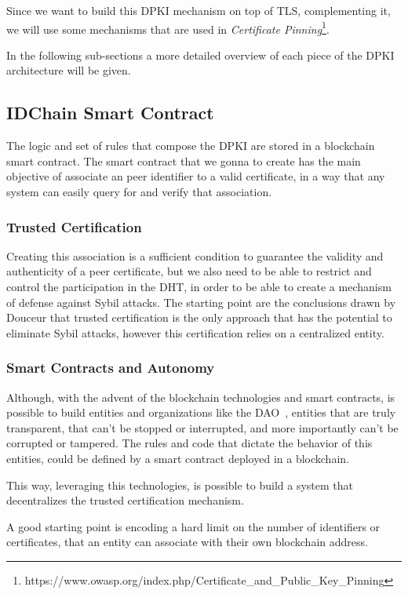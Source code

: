 Since we want to build this DPKI mechanism on top of TLS, complementing it, we will use some mechanisms that are used in \textit{Certificate Pinning}\footnote{https://www.owasp.org/index.php/Certificate\_and\_Public\_Key\_Pinning}.

In the following sub-sections a more detailed overview of each piece of the \ac{DPKI} architecture will be given.

\subsection{IDChain Smart Contract}

The logic and set of rules that compose the \ac{DPKI} are stored in a blockchain smart contract.
The smart contract that we gonna to create has the main objective of associate an peer identifier to a valid certificate, in a way that any system can easily query for and verify that association.

\subsubsection{Trusted Certification}
Creating this association is a sufficient condition to guarantee the validity and authenticity of a peer certificate, but we also need to be able to restrict and control the participation in the \ac{DHT}, in order to be able to create a mechanism of defense against Sybil attacks.
The starting point are the conclusions drawn by Douceur\cite{Douceur2002} that trusted certification is the only approach that has the potential to eliminate Sybil attacks, however this certification relies on a centralized entity.

\subsubsection{Smart Contracts and Autonomy}
Although, with the advent of the blockchain technologies and smart contracts, is possible to build entities and organizations like the DAO~\cite{ralphc.merkle2016}, entities that are truly transparent, that can't be stopped or interrupted, and more importantly can't be corrupted or tampered.
The rules and code that dictate the behavior of this entities, could be defined by a smart contract deployed in a blockchain.

This way, leveraging this technologies, is possible to build a system that decentralizes the trusted certification mechanism.

A good starting point is encoding a hard limit on the number of identifiers or certificates, that an entity can associate with their own blockchain address.

